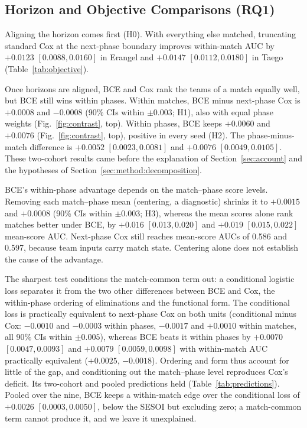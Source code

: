 \documentclass[sigconf,anonymous]{acmart}
\begin{document}
\subsection{Horizon and Objective Comparisons (RQ1)}
\label{sec:results:rq1}

Aligning the horizon comes first (H0). With everything else matched, truncating standard Cox at the next-phase boundary improves within-match AUC by $+0.0123$ $[0.0088,\allowbreak 0.0160]$ in Erangel and $+0.0147$ $[0.0112,\allowbreak 0.0180]$ in Taego (Table~\ref{tab:objective}).

Once horizons are aligned, BCE and Cox rank the teams of a match equally well, but BCE still wins within phases. Within matches, BCE minus next-phase Cox is $+0.0008$ and $-0.0008$ (90\% CIs within $\pm0.003$; H1), also with equal phase weights (Fig.~\ref{fig:contrast}, top). Within phases, BCE keeps $+0.0060$ and $+0.0076$ (Fig.~\ref{fig:contrast}, top), positive in every seed (H2). The phase-minus-match difference is $+0.0052$ $[0.0023,\allowbreak 0.0081]$ and $+0.0076$ $[0.0049,\allowbreak 0.0105]$. These two-cohort results came before the explanation of Section~\ref{sec:account} and the hypotheses of Section~\ref{sec:method:decomposition}.

BCE's within-phase advantage depends on the match--phase score levels. Removing each match--phase mean (centering, a diagnostic) shrinks it to $+0.0015$ and $+0.0008$ (90\% CIs within $\pm0.003$; H3), whereas the mean scores alone rank matches better under BCE, by $+0.016$ $[0.013,\allowbreak 0.020]$ and $+0.019$ $[0.015,\allowbreak 0.022]$ mean-score AUC. Next-phase Cox still reaches mean-score AUCs of 0.586 and 0.597, because team inputs carry match state. Centering alone does not establish the cause of the advantage.

The sharpest test conditions the match-common term out: a conditional logistic loss separates it from the two other differences between BCE and Cox, the within-phase ordering of eliminations and the functional form. The conditional loss is practically equivalent to next-phase Cox on both units (conditional minus Cox: $-0.0010$ and $-0.0003$ within phases, $-0.0017$ and $+0.0010$ within matches, all 90\% CIs within $\pm0.005$), whereas BCE beats it within phases by $+0.0070$ $[0.0047,\allowbreak 0.0093]$ and $+0.0079$ $[0.0059,\allowbreak 0.0098]$ with within-match AUC practically equivalent ($+0.0025$, $-0.0018$). Ordering and form thus account for little of the gap, and conditioning out the match--phase level reproduces Cox's deficit. Its two-cohort and pooled predictions held (Table~\ref{tab:predictions}). Pooled over the nine, BCE keeps a within-match edge over the conditional loss of $+0.0026$ $[0.0003,\allowbreak 0.0050]$, below the SESOI but excluding zero; a match-common term cannot produce it, and we leave it unexplained.
\end{document}

